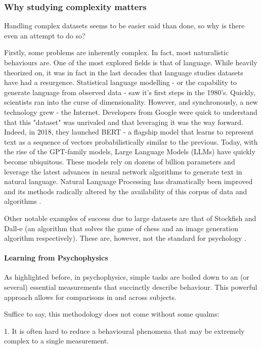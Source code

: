 \documentclass[11pt]{article}
\begin{document}
\subsubsection{Why studying complexity matters}
Handling complex datasets seems to be easier said than done, so why is there even an attempt to do so?

Firstly, some problems are inherently complex. In fact, most naturalistic behaviours are. One of the most explored fields is that of language. While heavily theorized on, it was in fact in the last decades that language studies datasets have had a resurgence. Statistical language modelling - or the capability to generate language from observed data - saw it's first steps in the 1980's. Quickly, scientists ran into the curse of dimensionality. However, and synchronously, a new technology grew - the Internet. Developers from Google were quick to understand that this "dataset" was unrivaled and that leveraging it was the way forward. Indeed, in 2018, they launched BERT - a flagship model that learns to represent text as a sequence of vectors probabilistically similar to the previous. Today, with the rise of the GPT-family models, Large Language Models (LLMs) have quickly become ubiquitous. These models rely on dozens of billion parameters and leverage the latest advances in neural network algorithms to generate text in natural language. Natural Language Processing has dramatically been improved and its methods radically altered by the availability of this corpus of data and algorithms \cite{guo2025deepseek}.

Other notable examples of success due to large datasets are that of Stockfish and Dall-e (an algorithm that solves the game of chess and an image generation algorithm respectively). These are, however, not the standard for psychology .

\paragraph{Learning from Psychophysics}
As highlighted before, in psychophysics, simple tasks are boiled down to an (or several) essential measurements that succinctly describe behaviour. This powerful approach allows for comparisons in and across subjects.

Suffice to say, this methodology does not come without some qualms:

1. It is often hard to reduce a behavioural phenomena that may be extremely complex to a single measurement.
\end{document}
